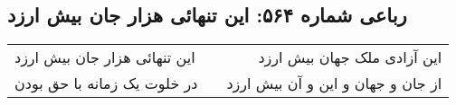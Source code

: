 \begin{center}
\section*{رباعی شماره ۵۶۴: این تنهائی هزار جان بیش ارزد}
\label{sec:0564}
\begin{longtable}{l p{0.5cm} r}
این تنهائی هزار جان بیش ارزد
&&
این آزادی ملک جهان بیش ارزد
\\
در خلوت یک زمانه با حق بودن
&&
از جان و جهان و این و آن بیش ارزد
\\
\end{longtable}
\end{center}
